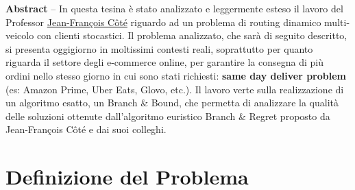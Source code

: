 \documentclass[
    article,            %
    12pt,                %
    oneside,            %
    a4paper,            %
    english,            %
    italian,                %
    sumario=tradicional,
]{abntex2}
\title{\LARGE \centering {\textbf{The dynamic vehicle routing problem with stochastic customer requests and multiple delivery routes}}}
\author{Lorenzo Sciandra,\and Stefano Vittorio Porta, \and Jean-François Côté}
\begin{document}
    \textual

    \pagestyle{meuestilo}

    \frenchspacing

    \maketitle
\thispagestyle{meuestilo}

    \begin{changemargin}{1cm}{1cm}
        \textbf{Abstract} – In questa tesina è stato analizzato e leggermente esteso il lavoro del Professor \href{https://www4.fsa.ulaval.ca/enseignant/jean-francois-cote/}{Jean-François Côté} riguardo ad un problema di routing dinamico multi-veicolo con clienti stocastici. Il problema analizzato, che sarà di seguito descritto, si presenta oggigiorno in moltissimi contesti reali, soprattutto per quanto riguarda il settore degli e-commerce online, per garantire la consegna di più ordini nello stesso giorno in cui sono stati richiesti: \textbf{same day deliver problem} (es: Amazon Prime, Uber Eats, Glovo, etc.). Il lavoro verte sulla realizzazione di un algoritmo esatto, un Branch \& Bound, che permetta di analizzare la qualità delle soluzioni ottenute dall'algoritmo euristico Branch \& Regret proposto da Jean-François Côté e dai suoi colleghi. 
        \vspace{\onelineskip}

        \noindent
    \end{changemargin}


\hypertarget{definizione-del-problema}{%
\section{Definizione del Problema}\label{definizione-del-problema}}
\end{document}
